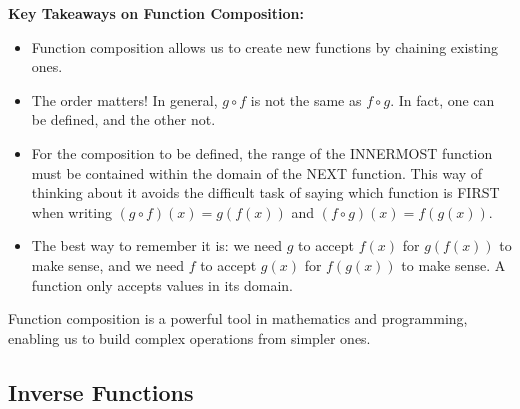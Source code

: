 \begin{rem} \textbf{Key Takeaways on Function Composition:}
  \begin{itemize}
    \item Function composition allows us to create new functions by chaining existing ones.
    \item The order matters! In general, \( g \circ f \) is not the same as \( f \circ g \). In fact, one can be defined, and the other not.
    \item For the composition to be defined, the range of the INNERMOST function must be contained within the domain of the NEXT function. This way of thinking about it avoids the difficult task of saying which function is FIRST when writing $(g\circ f)(x) = g(f(x))$ and $(f\circ g)(x)=f(g(x))$. 
    \item The best way to remember it is: we need $g$ to accept $f(x)$ for $g(f(x))$ to make sense, and we need $f$ to accept $g(x)$ for $f(g(x))$ to make sense. A function only accepts values in its domain. 
\end{itemize}  
\end{rem}

\bigskip

Function composition is a powerful tool in mathematics and programming, enabling us to build complex operations from simpler ones. 

\subsection{Inverse Functions}

